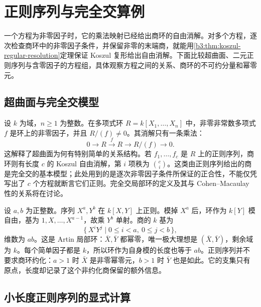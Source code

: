 
\section{正则序列与完全交算例}
\label{b3:sec:1504}

一个方程为非零因子时，它的乘法映射已经给出商环的自由消解。对多个方程，逐次检查商环中的非零因子条件，并保留非零的末端商，就能用\cref{b3:thm:koszul-regular-resolution}定理保证 Koszul 复形给出自由消解。下面比较超曲面、二元正则序列与含零因子的方程组，具体观察方程之间的关系、商环的不可约分量和幂零元。


%
%

\subsection{超曲面与完全交模型}
\label{b3:subsec:1504:01}

设 \(k\) 为域，\(n\ge1\) 为整数。在多项式环 \(R=k[X_1,\ldots,X_n]\) 中，非零非常数多项式 \(f\) 是环上的非零因子，并且 \(R/(f)\ne0\)。其消解只有一条乘法：
\[
	0\longrightarrow R\xrightarrow{f}R\longrightarrow R/(f)\longrightarrow0.
\]
这解释了超曲面为何有特别简单的关系结构。若 \(f_1,\ldots,f_c\) 是 \(R\) 上的正则序列，商环则有长度 \(c\) 的 Koszul 自由消解，第 \(i\) 项秩为 \(\binom ci\)。这类由正则序列给出的商是完全交的基本模型；此处用到的是逐次非零因子条件所保证的正合性，不能仅凭写出了 \(c\) 个方程就断言它们正则。完全交局部环的定义及其与 Cohen--Macaulay 性的关系将在讨论。

\ProseParagraphBreak
设 \(a,b\) 为正整数。序列 \(X^a,Y^b\) 在 \(k[X,Y]\) 上正则。模掉 \(X^a\) 后，环作为 \(k[Y]\) 模自由，基为 \(1,X,\ldots,X^{a-1}\)，故乘 \(Y^b\) 单射。商的 \(k\) 基为
\[
	\{\,X^iY^j\mid0\le i<a,\ 0\le j<b\,\},
\]
维数为 \(ab\)。这是 Artin 局部环：\(\bar X,\bar Y\) 都幂零，唯一极大理想是 \((\bar X,\bar Y)\)，剩余域为 \(k\)。每个简单因子都是 \(k\)，所以环作为自身模的长度也等于 \(ab\)。正则序列并不要求商环约化：\(a>1\) 时 \(\bar X\) 是非零幂零元，\(b>1\) 时 \(\bar Y\) 也是如此。它的支集只有原点，长度却记录了这个非约化商保留的额外信息。

\subsection{小长度正则序列的显式计算}
\label{b3:subsec:1504:02}

